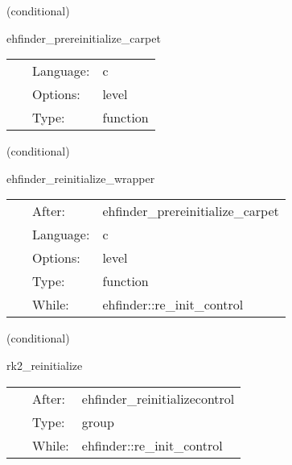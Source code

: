    (conditional) 

\hspace{5mm} ehfinder\_prereinitialize\_carpet 

\hspace{5mm}{\it carpet version of the pre-reinitialization routines } 


\hspace{5mm}

 \begin{tabular*}{160mm}{cll} 
~ & Language:  & c \\ 
~ & Options:  & level \\ 
~ & Type:  & function \\ 
\end{tabular*} 


\vspace{5mm}

   (conditional) 

\hspace{5mm} ehfinder\_reinitialize\_wrapper 

\hspace{5mm}{\it wrapper routine for euler re-initialization for carpet } 


\hspace{5mm}

 \begin{tabular*}{160mm}{cll} 
~ & After:  & ehfinder\_prereinitialize\_carpet \\ 
~ & Language:  & c \\ 
~ & Options:  & level \\ 
~ & Type:  & function \\ 
~ & While:  & ehfinder::re\_init\_control \\ 
\end{tabular*} 


\vspace{5mm}

   (conditional) 

\hspace{5mm} rk2\_reinitialize 

\hspace{5mm}{\it schedule group for rk2 re-initialization } 


\hspace{5mm}

 \begin{tabular*}{160mm}{cll} 
~ & After:  & ehfinder\_reinitializecontrol \\ 
~ & Type:  & group \\ 
~ & While:  & ehfinder::re\_init\_control \\ 
\end{tabular*} 


